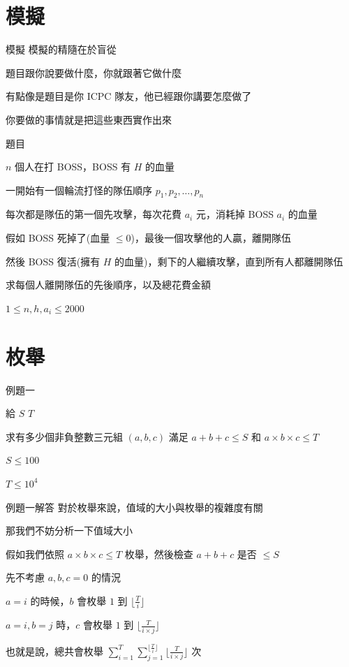 
\section{模擬}

\begin{frame}{模擬}
    模擬的精隨在於盲從

    題目跟你說要做什麼，你就跟著它做什麼\pause

    有點像是題目是你 ICPC 隊友，他已經跟你講要怎麼做了

    你要做的事情就是把這些東西實作出來
\end{frame}

\begin{frame}{題目}
    \begin{exercise}
        $n$ 個人在打 BOSS，BOSS 有 $H$ 的血量

        一開始有一個輪流打怪的隊伍順序 $p_1, p_2, \ldots, p_n$

        每次都是隊伍的第一個先攻擊，每次花費 $a_i$ 元，消耗掉 BOSS $a_i$ 的血量

        假如 BOSS 死掉了(血量 $\le 0$)，最後一個攻擊他的人贏，離開隊伍

        然後 BOSS 復活(擁有 $H$ 的血量)，剩下的人繼續攻擊，直到所有人都離開隊伍

        求每個人離開隊伍的先後順序，以及總花費金額

        $1 \le n, h, a_i \le 2000$
    \end{exercise}
\end{frame}

\section{枚舉}

\begin{frame}{例題一}
    \begin{problem}
        給 $S$ $T$

        求有多少個非負整數三元組 $(a, b, c)$ 滿足 $a + b + c \le S$ 和 $a \times b \times c \le T$

        $S \le 100$

        $T \le 10^4$
    \end{problem}
\end{frame}

\begin{frame}{例題一解答}
    對於枚舉來說，值域的大小與枚舉的複雜度有關

    那我們不妨分析一下值域大小\pause

    假如我們依照 $a \times b \times c \le T$ 枚舉，然後檢查 $a + b + c$ 是否 $\le S$\pause

    先不考慮 $a, b, c = 0$ 的情況

    $a = i$ 的時候，$b$ 會枚舉 $1$ 到 $\lfloor \frac{T}{i} \rfloor$

    $a = i, b = j$ 時，$c$ 會枚舉 $1$ 到 $\lfloor \frac{T}{i \times j} \rfloor$

    也就是說，總共會枚舉 $\sum^{T}_{i=1} \sum^{\lfloor \frac{T}{i} \rfloor}_{j=1} \lfloor \frac{T}{i \times j} \rfloor$ 次
\end{frame}

